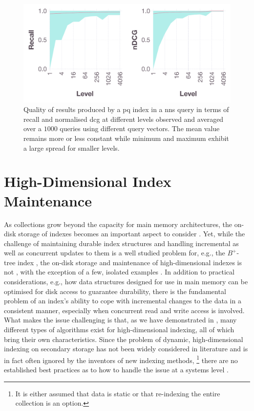 \begin{figure}
    \centering
    \includegraphics[width=\textwidth]{figures/index-quality-pq}
    \caption{Quality of results produced by a \acrshort{pq} index in a \acrshort{nns} query in terms of recall and normalised \acrshort{dcg} at different levels observed and averaged over a $1000$ queries using different query vectors. The mean value remains more or less constant while minimum and maximum exhibit a large spread for smaller levels.}
    \label{figure:index_quality}
\end{figure}

\section{High-Dimensional Index Maintenance}
\label{section:hd_index_maintenance}

As collections grow beyond the capacity for main memory architectures, the on-disk storage of indexes becomes an important aspect to consider \cite{Lejsek:2009NVTree,Jayaram:2019DiskANN,Chen:2021SPANN}. Yet, while the challenge of maintaining durable index structures and handling incremental as well as concurrent updates to them is a well studied problem for, e.g., the $B^{+}$-tree index \cite{Garcia:2009Database,Petrov:2019Database}, the on-disk storage and maintenance of high-dimensional indexes is not \cite{Amsaleg:2014Database}, with the exception of a few, isolated examples \cite{Olafsson:2011Dynamic,Hojsgaard:2019Index,Lu:2020VHP}. In addition to practical considerations, e.g., how data structures designed for use in main memory can be optimised for disk access to guarantee durability, there is the fundamental problem of an index's ability to cope with incremental changes to the data in a consistent manner, especially when concurrent read and write access is involved. What makes the issue challenging is that, as we have demonstrated in , many different types of algorithms exist for high-dimensional indexing, all of which bring their own characteristics. Since the problem of dynamic, high-dimensional indexing on secondary storage has not been widely considered in literature and is in fact often ignored by the inventors of new indexing methods, \footnote{It is either assumed that data is static or that re-indexing the entire collection is an option.} there are no established best practices as to how to handle the issue at a systems level \cite{Olafsson:2011Dynamic,Amsaleg:2014Database}.

